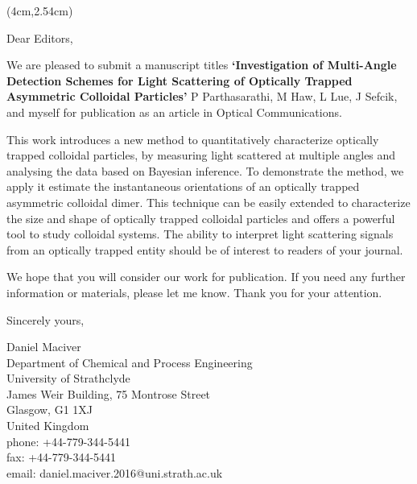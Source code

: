 \documentclass[]{letter}
\begin{document}
\begin{textblock*}{13cm}(4cm,2.54cm) %
	\begin{letter}{Dear Editors,}
	\opening{}
	We are pleased to submit a manuscript titles \textbf{‘Investigation of Multi-Angle Detection Schemes for Light Scattering of Optically Trapped Asymmetric Colloidal Particles’} P Parthasarathi, M Haw, L Lue, J Sefcik,
	and myself for publication as an article in Optical Communications.
	
	This work introduces a new method to quantitatively characterize
	optically trapped colloidal particles, by measuring light scattered at
	multiple angles and analysing the data based on Bayesian inference.
	To demonstrate the method, we apply it estimate the instantaneous
	orientations of an optically trapped asymmetric colloidal dimer.  This
	technique can be easily extended to characterize the size and shape of
	optically trapped colloidal particles and offers a powerful tool to
	study colloidal systems. The ability to interpret light scattering signals from an optically trapped entity should be of interest to readers
	of your journal.
	
	We hope that you will consider our work for publication.  If you need
	any further information or materials, please let me know.  Thank you
	for your attention.
	
	Sincerely yours,
	
	Daniel Maciver \\
	
	Department of Chemical and Process Engineering \\
	University of Strathclyde \\
	James Weir Building, 75 Montrose Street \\
	Glasgow, G1 1XJ \\
	United Kingdom \\ 
	
	phone: +44-779-344-5441 \\
	fax:   +44-779-344-5441 \\
	email: daniel.maciver.2016@uni.strath.ac.uk
	\end{letter}
\end{textblock*}



\end{document}
